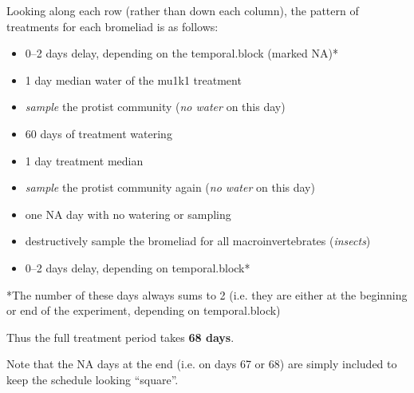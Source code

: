 \documentclass[12pt]{article}
\begin{document}
Looking along each row (rather than down each column), the pattern of
treatments for each bromeliad is as follows:

\begin{itemize}
\item 0--2 days delay, depending on the temporal.block (marked NA)*
\item 1 day median water of the mu1k1 treatment
\item \emph{sample} the protist community (\emph{no water} on this day)
\item 60 days of treatment watering
\item 1 day treatment median
\item \emph{sample} the protist community again (\emph{no water} on
  this day)
\item one NA day with no watering or sampling
\item destructively sample the bromeliad for all macroinvertebrates
  (\emph{insects})
\item 0--2 days delay, depending on temporal.block*
\end{itemize}

*The number of these days always sums to 2 (i.e. they are either at
the beginning or end of the experiment, depending on temporal.block)

Thus the full treatment period takes \textbf{68 days}.

Note that the NA days at the end (i.e. on days 67 or 68) are simply
included to keep the schedule looking ``square''.
\end{document}
